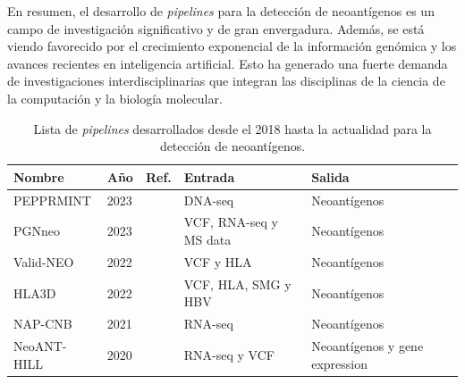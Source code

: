 \documentclass[a4paper]{article}
\begin{document}
En resumen, el desarrollo de \textit{pipelines} para la detección de neoantígenos es un campo de investigación significativo y de gran envergadura. Además, se está viendo favorecido por el crecimiento exponencial de la información genómica y los avances recientes en inteligencia artificial. Esto ha generado una fuerte demanda de investigaciones interdisciplinarias que integran las disciplinas de la ciencia de la computación y la biología molecular.





	
\begin{table}[h]
	\caption{Lista de \textit{pipelines} desarrollados desde el 2018 hasta la actualidad para la detección de neoantígenos.}
	\label{tab:review_pipelines}
	\setlength{\tabcolsep}{0.5em} %
	{\renewcommand{\arraystretch}{1.5}%
		
	
			\begin{tabular}{lp{0.6cm}p{3cm}p{4.5cm}p{2.7cm}}
	\textbf{Nombre} & \textbf{Año}  & \textbf{Ref.}                                 & \textbf{Entrada}                                         & \textbf{Salida}                                     \\ \hline
	
	PEPPRMINT         & 2023 &\cite{zhou2023prioritizing}         & DNA-seq                                                  & Neoantígenos                                        \\

	PGNneo & 2023	& \cite{tan2023pgnneo}	& VCF, RNA-seq y MS data	& Neoantígenos \\
	
	Valid-NEO       & 2022 &\cite{terai2022valid}             & VCF y HLA          & Neoantígenos  \\
	
	HLA3D & 2022	& \cite{li2022hla3d}	& VCF, HLA, SMG y HBV	& Neoantígenos \\
	
	
	
	NAP-CNB         & 2021 &\cite{wert2021predicting}         & RNA-seq                                                  & Neoantígenos                                       \\
	
	NeoANT-HILL     & 2020 &\cite{coelho2020neoant}           & RNA-seq y VCF                        & Neoantígenos y gene expression  \\
	

\end{tabular}}
\end{table}
\end{document}
